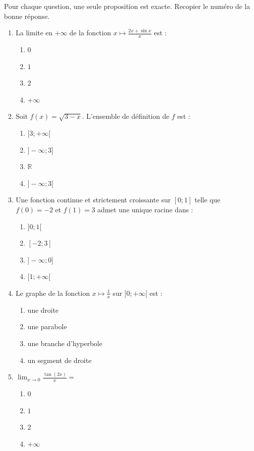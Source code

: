 \documentclass[11pt]{article}
\begin{document}
\begin{exercice}
\noindent Pour chaque question, une seule proposition est exacte. Recopier le numéro de la bonne réponse.
\begin{enumerate}
    \item La limite en $+\infty$ de la fonction $x \mapsto \frac{2x+\sin x}{x}$ est :
    \begin{enumerate}
        \item $0$ \item $1$ \item $2$ \item $+\infty$
    \end{enumerate}
    \item Soit $f(x)=\sqrt{3-x}$. L'ensemble de définition de $f$ est :
    \begin{enumerate}
        \item $[3;+\infty[$ \item $]-\infty;3]$ \item $\mathbb{R}$ \item $]-\infty;3[$
    \end{enumerate}
    \item Une fonction continue et strictement croissante sur $[0;1]$ telle que $f(0)=-2$ et $f(1)=3$ admet une unique racine dans :
    \begin{enumerate}
        \item $]0;1[$ \item $[-2;3]$ \item $]-\infty;0]$ \item $[1;+\infty[$
    \end{enumerate}
    \item Le graphe de la fonction $x \mapsto \frac{1}{x}$ sur $]0;+\infty[$ est :
    \begin{enumerate}
        \item une droite \item une parabole \item une branche d'hyperbole \item un segment de droite
    \end{enumerate}
    \item $\lim_{x\to 0} \frac{\tan(2x)}{x} = $
    \begin{enumerate}
        \item $0$ \item $1$ \item $2$ \item $+\infty$
    \end{enumerate}
\end{enumerate}
\end{exercice}
\end{document}
